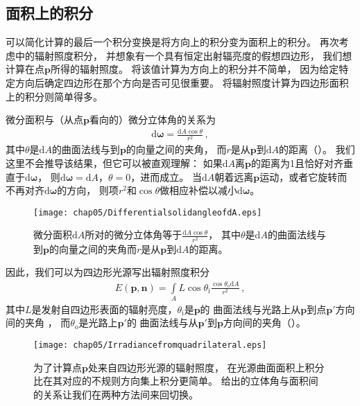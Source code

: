 \subsection{面积上的积分}\label{sub:面积上的积分}
可以简化计算的最后一个积分变换是将方向上的积分变为面积上的积分。
再次考虑中的辐射照度积分，
并想象有一个具有恒定出射辐亮度的假想四边形，
我们想计算在点$\bm p$所得的辐射照度。
将该值计算为方向上的积分并不简单，
因为给定特定方向后确定四边形在那个方向是否可见很重要。
将辐射照度计算为四边形面积上的积分则简单得多。

微分面积与（从点$\bm p$看向的）微分立体角的关系为
\begin{align}\label{eq:5.6}
    \mathrm{d}{\bm\omega}=\frac{\mathrm{d}A\cos\theta}{r^2}\, ,
\end{align}
其中$\theta$是$\mathrm{d}A$的曲面法线与到$\bm p$的向量之间的夹角，
而$r$是从$\bm p$到$\mathrm{d}A$的距离（）。
我们这里不会推导该结果，但它可以被直观理解：
如果$\mathrm{d}A$离$\bm p$的距离为1且恰好对齐垂直于$\mathrm{d}\bm\omega$，
则$\mathrm{d}{\bm\omega}=\mathrm{d}A$，$\theta=0$，进而成立。
当$\mathrm{d}A$朝着远离$\bm p$运动，或者它旋转而不再对齐$\mathrm{d}\bm\omega$的方向，
则项$r^2$和$\cos\theta$做相应补偿以减小$\mathrm{d}\bm\omega$。
\begin{figure}[htbp]
    \centering\texttt{[image: chap05/DifferentialsolidangleofdA.eps]}
    \caption{微分面积$\mathrm{d}A$所对的微分立体角等于$\displaystyle\frac{\mathrm{d}A\cos\theta}{r^2}$，
        其中$\theta$是$\mathrm{d}A$的曲面法线与到$\bm p$的向量之间的夹角而$r$是从$\bm p$到$\mathrm{d}A$的距离。}
    \label{fig:5.16}
\end{figure}

因此，我们可以为四边形光源写出辐射照度积分
\begin{align*}
    E({\bm p},{\bm n})=\int\limits_A L\cos\theta_{\mathrm{i}}\frac{\cos\theta_{\mathrm{o}}\mathrm{d}A}{r^2}\, ,
\end{align*}
其中$L$是发射自四边形表面的辐射亮度，$\theta_{\mathrm{i}}$是$\bm p$的
曲面法线与光路上从$\bm p$到点$\bm p'$方向间的夹角
，
而$\theta_{\mathrm{o}}$是光路上$\bm p'$的
曲面法线与从$\bm p'$到$\bm p$方向间的夹角（）。
\begin{figure}[htbp]
    \centering\texttt{[image: chap05/Irradiancefromquadrilateral.eps]}
    \caption{为了计算点$\bm p$处来自四边形光源的辐射照度，
        在光源曲面面积上积分比在其对应的不规则方向集上积分更简单。
        给出的立体角与面积间的关系让我们在两种方法间来回切换。}
    \label{fig:5.17}
\end{figure}